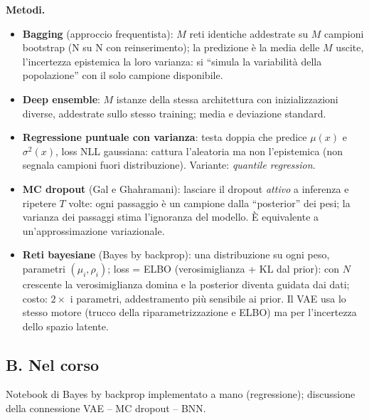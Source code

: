 \documentclass[11pt,a4paper]{article}
\newcommand{\dom}[1]{\par\smallskip\noindent\textbf{#1}\par\nopagebreak}
\begin{document}
\dom{Metodi.}
\begin{itemize}
\item \textbf{Bagging} (approccio frequentista): $M$ reti identiche addestrate su $M$ campioni bootstrap (N su N con reinserimento); la predizione \`e la media delle $M$ uscite, l'incertezza epistemica la loro varianza: si ``simula la variabilit\`a della popolazione'' con il solo campione disponibile.
\item \textbf{Deep ensemble}: $M$ istanze della stessa architettura con inizializzazioni diverse, addestrate sullo stesso training; media e deviazione standard.
\item \textbf{Regressione puntuale con varianza}: testa doppia che predice $\mu(x)$ e $\sigma^2(x)$, loss NLL gaussiana: cattura l'aleatoria ma non l'epistemica (non segnala campioni fuori distribuzione). Variante: \emph{quantile regression}.
\item \textbf{MC dropout} (Gal e Ghahramani): lasciare il dropout \emph{attivo} a inferenza e ripetere $T$ volte: ogni passaggio \`e un campione dalla ``posterior'' dei pesi; la varianza dei passaggi stima l'ignoranza del modello. \`E equivalente a un'approssimazione variazionale.
\item \textbf{Reti bayesiane} (Bayes by backprop): una distribuzione su ogni peso, parametri $(\mu_i,\rho_i)$; loss = ELBO (verosimiglianza + KL dal prior): con $N$ crescente la verosimiglianza domina e la posterior diventa guidata dai dati; costo: $2\times$ i parametri, addestramento pi\`u sensibile ai prior. Il VAE usa lo stesso motore (trucco della riparametrizzazione e ELBO) ma per l'incertezza dello spazio latente.
\end{itemize}

\subsection*{B. Nel corso}
Notebook di Bayes by backprop implementato a mano (regressione); discussione della connessione VAE -- MC dropout -- BNN.
\end{document}
